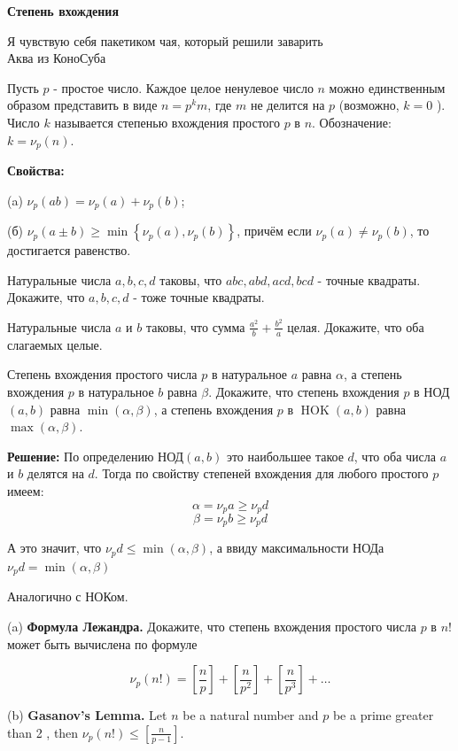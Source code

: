 \centerline{\bf \Huge Степень вхождения}

\begin{flushright}
        \scriptsize{Я чувствую себя пакетиком чая, который решили заварить\\ Аква из КоноСуба}
\end{flushright}

Пусть $p$ - простое число. Каждое целое ненулевое число $n$ можно единственным образом представить в виде $n=p^k m$, где $m$ не делится на $p$ (возможно, $k=0$ ). Число $k$ называется степенью вхождения простого $p$ в $n$. Обозначение: $k=\nu_p(n)$.

\textbf{\large Свойства:}

(a) $\nu_p(a b)=\nu_p(a)+\nu_p(b)$;

(б) $\nu_p(a \pm b) \geqslant \min \left\{\nu_p(a), \nu_p(b)\right\}$, причём если $\nu_p(a) \neq \nu_p(b)$, то достигается равенство.

Натуральные числа $a, b, c, d$ таковы, что $a b c, a b d, a c d, b c d$ - точные квадраты. Докажите, что $a, b, c, d$ - тоже точные квадраты.

Натуральные числа $a$ и $b$ таковы, что сумма $\frac{a^2}{b}+\frac{b^2}{a}$ целая. Докажите, что оба слагаемых целые.

Степень вхождения простого числа $p$ в натуральное $a$ равна $\alpha$, а степень вхождения $p$ в натуральное $b$ равна $\beta$. Докажите, что степень вхождения $p$ в НОД $(a, b)$ равна $\min (\alpha, \beta)$, а степень вхождения $p$ в $\operatorname{HOK}(a, b)$ равна $\max (\alpha, \beta)$.

\textbf{Решение:}
По определению НОД$(a,b)$ это наибольшее такое $d$, что оба числа $a$ и $b$ делятся на $d$. Тогда по свойству степеней вхождения для любого простого $p$ имеем:
$$
    \alpha = \nu_p a \geqslant \nu_p d
$$
$$
    \beta = \nu_p b \geqslant \nu_p d
$$

А это значит, что $\nu_p d \leqslant \min(\alpha, \beta)$, а ввиду максимальности НОДа $\nu_p d = \min(\alpha, \beta)$

Аналогично с НОКом.

(a) \textbf{Формула Лежандра.} Докажите, что степень вхождения простого числа $p$ в $n!$ может быть вычислена по формуле

$$
\nu_p(n!)=\left[\frac{n}{p}\right]+\left[\frac{n}{p^2}\right]+\left[\frac{n}{p^3}\right]+\ldots
$$

(b)
\textbf{Gasanov's Lemma.}
Let $n$ be a natural number and $p$ be a prime greater than 2 , then $\nu_p(n!) \leq\left[\frac{n}{p-1}\right]$.

